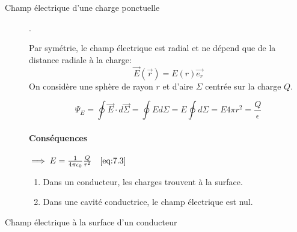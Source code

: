 \documentclass[
    11pt,
    a4paper,
    oneside,
    headinlcude, footinclude,
    twoside,
]{report}
\renewcommand{\vec}[1]{\overrightarrow{#1}}
\begin{document}
\begin{description}
    \item[Champ électrique d'une charge ponctuelle] {\color{white}.}

        \begin{center}
            \begin{minipage}{.5\linewidth}
                \setlength{\parskip}{.3em}
                Par symétrie, le champ électrique est radial et ne dépend que
                de la distance radiale à la charge: $$\vec E(\vec r) = E(r) \vec{e_{r}}$$
                On considère une sphère de rayon $r$ et d'aire $\Sigma$
                centrée sur la charge $Q$.

            \end{minipage}
            \begin{minipage}{.49\linewidth}
            \end{minipage}
        \end{center}

        \begin{equation}
            \label{eq:7.21}
            \Psi_E = \oint \vec E \cdot d \vec \Sigma = \oint E d \Sigma =
            E \oint  d \Sigma = E 4 \pi r^2 = \frac{Q}{\epsilon}
        \end{equation}
        
        \paragraph{Conséquences}

        $\implies E = \frac{1}{4 \pi \epsilon_0} \frac{Q}{r^2} \quad \eqref{eq:7.3}$

        \begin{enumerate}
            \item Dans un conducteur, les charges trouvent à la surface.

            \item Dans une cavité conductrice, le champ électrique est nul.
        \end{enumerate}

    \item[Champ électrique à la surface d'un conducteur] 

        \begin{center}
        \end{center}


\end{description}
\end{document}
